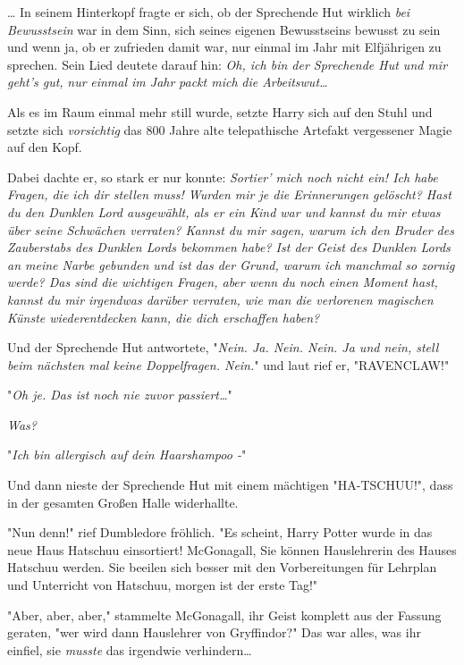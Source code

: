 {\later

… In seinem Hinterkopf fragte er sich, ob der Sprechende Hut wirklich \emph{bei Bewusstsein} war in dem Sinn, sich seines eigenen Bewusstseins bewusst zu sein und wenn ja, ob er zufrieden damit war, nur einmal im Jahr mit Elfjährigen zu sprechen. Sein Lied deutete darauf hin: \emph{Oh, ich bin der Sprechende Hut und mir geht's gut,} \emph{nur} \emph{einmal im Jahr} \emph{packt mich} \emph{die Arbeitswut…}

Als es im Raum einmal mehr still wurde, setzte Harry sich auf den Stuhl und setzte sich \emph{vorsichtig} das 800 Jahre alte telepathische Artefakt vergessener Magie auf den Kopf.

Dabei dachte er, so stark er nur konnte: \emph{Sortier' mich noch nicht ein! Ich habe Fragen, die ich dir stellen muss! Wurden mir je die Erinnerungen gelöscht? Hast du den Dunklen Lord ausgewählt, als er ein Kind war und kannst du mir etwas über seine Schwächen verraten? Kannst du mir sagen, warum ich den Bruder des Zauberstabs des Dunklen Lords bekommen habe? Ist der Geist des Dunklen Lords an meine Narbe gebunden und ist das der Grund, warum ich manchmal so zornig werde? Das sind die wichtigen Fragen, aber wenn du noch einen Moment hast, kannst du mir irgendwas darüber verraten, wie man die verlorenen magischen Künste wiederentdecken kann, die dich erschaffen haben?}

Und der Sprechende Hut antwortete, "\emph{Nein. Ja. Nein. Nein. Ja und nein, stell beim nächsten mal keine Doppelfragen. Nein.}" und laut rief er, "RAVENCLAW!"

\later

"\emph{Oh je. Das ist noch nie zuvor passiert…}"

\emph{Was?}

"\emph{Ich bin allergisch auf dein Haarshampoo -}"

Und dann nieste der Sprechende Hut mit einem mächtigen "HA-TSCHUU!", dass in der gesamten Großen Halle widerhallte.

"Nun denn!" rief Dumbledore fröhlich. "Es scheint, Harry Potter wurde in das neue Haus Hatschuu einsortiert! McGonagall, Sie können Hauslehrerin des Hauses Hatschuu werden. Sie beeilen sich besser mit den Vorbereitungen für Lehrplan und Unterricht von Hatschuu, morgen ist der erste Tag!"

"Aber, aber, aber," stammelte McGonagall, ihr Geist komplett aus der Fassung geraten, "wer wird dann Hauslehrer von Gryffindor?" Das war alles, was ihr einfiel, sie \emph{musste} das irgendwie verhindern…

}
